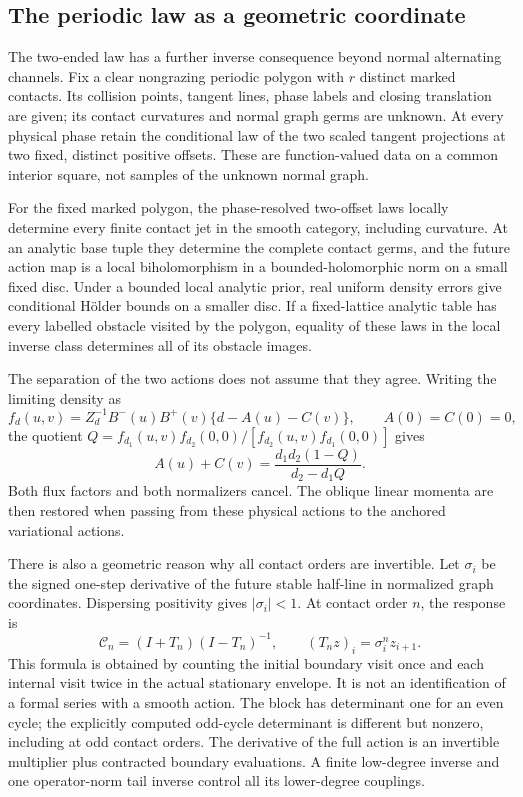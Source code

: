 \subsection{The periodic law as a geometric coordinate}

The two-ended law has a further inverse consequence beyond normal
alternating channels.  Fix a clear nongrazing periodic polygon with $r$
distinct marked contacts.  Its collision points, tangent lines, phase
labels and closing translation are given; its contact curvatures and
normal graph germs are unknown.  At every physical phase retain the
conditional law of the two scaled tangent projections at two fixed,
distinct positive offsets.  These are function-valued data on a common
interior square, not samples of the unknown normal graph.

\begin{theorem}\label{thm:v65-intro-inverse}
For the fixed marked polygon, the phase-resolved two-offset laws locally
determine every finite contact jet in the smooth category, including
curvature.  At an analytic base tuple they determine the complete contact
germs, and the future action map is a local biholomorphism in a
bounded-holomorphic norm on a small fixed disc.  Under a bounded local
analytic prior, real uniform density errors give conditional H\"older
bounds on a smaller disc.  If a fixed-lattice analytic table has every
labelled obstacle visited by the polygon, equality of these laws in the
local inverse class determines all of its obstacle images.
\end{theorem}

The separation of the two actions does not assume that they agree.
Writing the limiting density as
\[
 f_d(u,v)=Z_d^{-1}B^-(u)B^+(v)\{d-A(u)-C(v)\},
 \qquad A(0)=C(0)=0,
\]
the quotient $Q=f_{d_1}(u,v)f_{d_2}(0,0)/
[f_{d_2}(u,v)f_{d_1}(0,0)]$ gives
\[
 A(u)+C(v)=\frac{d_1d_2(1-Q)}{d_2-d_1Q}.
\]
Both flux factors and both normalizers cancel.  The oblique linear
momenta are then restored when passing from these physical actions to
the anchored variational actions.

There is also a geometric reason why all contact orders are invertible.
Let $\sigma_i$ be the signed one-step derivative of the future stable
half-line in normalized graph coordinates.  Dispersing positivity gives
$|\sigma_i|<1$.  At contact order $n$, the response is
\begin{equation}\label{eq:v65-intro-cayley}
 \mathcal C_n=(I+T_n)(I-T_n)^{-1},\qquad
 (T_nz)_i=\sigma_i^n z_{i+1}.
\end{equation}
This formula is obtained by counting the initial boundary visit once and
each internal visit twice in the actual stationary envelope.  It is not
an identification of a formal series with a smooth action.  The block
has determinant one for an even cycle; the explicitly computed odd-cycle
determinant is different but nonzero, including at odd contact orders.
The derivative of the full action is an invertible multiplier plus
contracted boundary evaluations.  A finite low-degree inverse and one
operator-norm tail inverse control all its lower-degree couplings.

